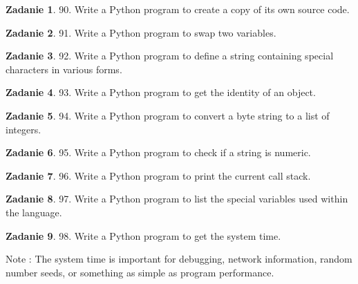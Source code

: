 \documentclass[11pt]{article}
\theoremstyle{definition}
\newtheorem{zadanie}{Zadanie}
\begin{document}
\begin{zadanie}


90. Write a Python program to create a copy of its own source code. 

\end{zadanie}

\begin{zadanie}


91. Write a Python program to swap two variables. 

\end{zadanie}

\begin{zadanie}


92. Write a Python program to define a string containing special characters in various forms. 

\end{zadanie}

\begin{zadanie}


93. Write a Python program to get the identity of an object. 

\end{zadanie}

\begin{zadanie}


94. Write a Python program to convert a byte string to a list of integers. 

\end{zadanie}

\begin{zadanie}


95. Write a Python program to check if a string is numeric. 

\end{zadanie}

\begin{zadanie}


96. Write a Python program to print the current call stack. 

\end{zadanie}

\begin{zadanie}


97. Write a Python program to list the special variables used within the language. 

\end{zadanie}

\begin{zadanie}


98. Write a Python program to get the system time. 

Note : The system time is important for debugging, network information, random number seeds, or something as simple as program performance.

\end{zadanie}
\end{document}
